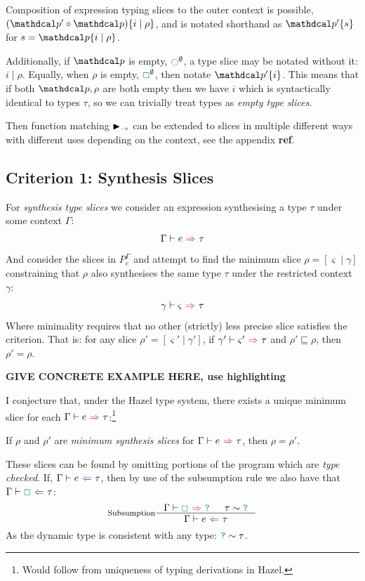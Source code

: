 Composition of expression typing slices to the outer context is possible, $(\p' \circ \p)\{i \mid \rho\}$, and is notated shorthand as $\p'\{s\}$ for $s = \p\{i \mid \rho\}$.

Additionally, if $\p$ is empty, $\cmark^\emptyset$, a type slice may be notated without it: $i \mid \rho$. Equally, when $\rho$ is empty, ${\color{teal}\Box}^\emptyset$, then notate $\p'\{i\}$. This means that if both $\p, \rho$ are both empty then we have $i$ which is syntactically identical to types $\tau$, so we can trivially treat types as \textit{empty type slices}.  

Then function matching $\blacktriangleright_\rightarrow$ can be extended to slices in multiple different ways with different uses depending on the context, see the appendix \textbf{ref}.

\subsection{Criterion 1: Synthesis Slices}
\label{sec:SynthesisSlices}
For \textit{synthesis type slices} we consider an expression synthesising a type $\tau$ under some context $\Gamma$:
\[\synthesis{e}{\tau}\]
And consider the slices in $P_e^{\Gamma}$ and attempt to find the minimum slice $\rho = [\varsigma\mid \gamma]$ constraining that $\rho$ also synthesises the same type $\tau$ under the restricted context $\gamma$:
\[\synthesis[\gamma]{\varsigma}{\tau}\]
Where minimality requires that no other (strictly) less precise slice satisfies the criterion. That is: for any slice $\rho' = [\varsigma'\mid \gamma']$, if $\synthesis[\gamma']{\varsigma'}{\tau}$ and $\rho' \sqsubseteq \rho$, then $\rho' = \rho$.

\textbf{GIVE CONCRETE EXAMPLE HERE, use highlighting}

I conjecture that, under the Hazel type system, there exists a unique minimum slice for each $\synthesis{e}{\tau}$:\footnote{Would follow from uniqueness of typing derivations in Hazel.}
\begin{conjecture}[Uniqueness]\label{conj:SynthesisSliceUniqueness}
If $\rho$ and $\rho'$ are \textit{minimum synthesis slices} for $\synthesis{e}{\tau}$, then $\rho = \rho'$.
\end{conjecture}

These slices can be found by omitting portions of the program which are \textit{type checked}. If, $\analysis{e}{\tau}$, then by use of the subsumption rule we also have that $\analysis{\gap}{\tau}$:
\[\inference[Subsumption]{\synthesis{\gap}{\dyn} & \tau \sim \dyn}{\analysis{e}{\tau}}\] 
As the dynamic type is consistent with any type: ${\color{teal}\texttt{?}} \sim \tau$.

